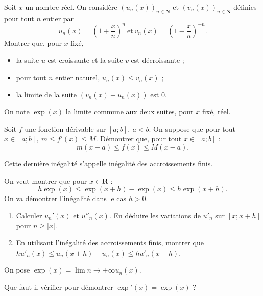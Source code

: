\documentclass[11pt,a4paper,french]{article}
\newcommand{\R}{\mathbf{R}}
\newcommand{\N}{\mathbf{N}}
\newcommand{\abs}[1]{\left\lvert #1 \right\rvert}
\theoremstyle{break}
\theoremstyle{plain}
\theoremstyle{nonumberplain}
\theoremstyle{nonumberbreak}
\begin{document}
\begin{question}
  Soit $x$ un nombre réel. On considère $(u_n(x))_{n \in \N}$ et
  $(v_n(x))_{n \in \N}$ définies pour tout $n$ entier par \[ u_n(x) =
  \left( 1 + \frac{x}n \right)^n \ \text{et}\ v_n(x) = \left( 1 -
  \frac{x}n \right)^{-n} . \]
  Montrer que, pour $x$ fixé,
  \begin{itemize}
    \item la suite $u$ est croissante et la suite $v$ est décroissante ;
    \item pour tout $n$ entier naturel, $u_n(x) ≤ v_n(x)$ ;
    \item la limite de la suite $(v_n(x) - u_n(x))$ est 0.
  \end{itemize}
\end{question}

On note $\exp(x)$ la limite commune aux deux suites, pour $x$ fixé, réel.

\begin{question}
  Soit $f$ une fonction dérivable sur $[a;b],\ a < b$. On suppose que
  pour tout $x \in [a;b],\ m ≤ f'(x) ≤ M$. Démontrer que, pour tout $x
  \in [a;b]$ : \[ m(x - a) ≤ f(x) ≤ M(x - a) . \]
\end{question}

Cette dernière inégalité s'appelle inégalité des accroissements finis.

\begin{question}
  On veut montrer que pour $x \in \R$ : \[ h \exp(x) ≤ \exp(x + h) -
  \exp(x) ≤ h \exp(x + h) . \]
  On va démontrer l'inégalité dans le cas $h > 0$.
  \begin{enumerate}
    \item Calculer $u_n'(x)$ et $u''_n(x)$. En déduire les variations de
      $u'_n$ sur $[x; x+h]$ pour $n ≥ \abs{x}$.
    \item En utilisant l'inégalité des accroissements finis, montrer que
      $h u'_n(x) ≤ u_n(x + h) - u_n(x) ≤ hu'_n(x + h)$.
  \end{enumerate}
\end{question}

\begin{question}
  On pose $\exp(x) = \lim{n \to +\infty} u_n(x)$.

  Que faut-il vérifier pour démontrer $\exp'(x) = \exp(x)$ ?
\end{question}
\end{document}
